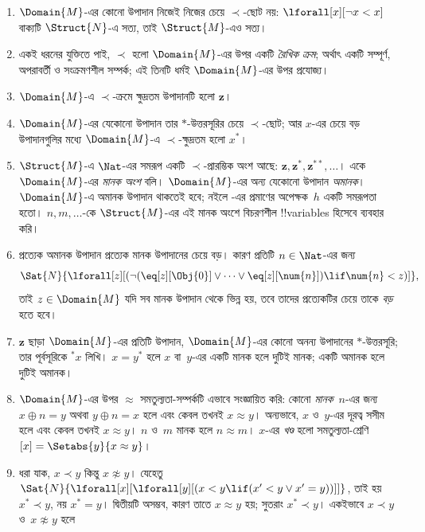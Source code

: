 \documentclass[../../../include/open-logic-section]{subfiles}
\begin{document}
\begin{enumerate}
\item $\Domain{M}$-এর কোনো উপাদান নিজেই নিজের চেয়ে $\prec$-ছোট নয়:
  $\lforall[x][\lnot x < x]$ বাক্যটি $\Struct{N}$-এ সত্য,
  তাই $\Struct{M}$-এও সত্য।
\item একই ধরনের যুক্তিতে পাই, $\prec$ হলো $\Domain{M}$-এর উপর
  একটি \emph{রৈখিক ক্রম}; অর্থাৎ একটি সম্পূর্ণ, অপরাবর্তী ও
  সংক্রমণশীল সম্পর্ক; এই তিনটি ধর্মই $\Domain{M}$-এর উপর প্রযোজ্য।
\item $\Domain{M}$-এ $\prec$-ক্রমে ক্ষুদ্রতম উপাদানটি হলো
  $\mathbf{z}$।
\item $\Domain{M}$-এর যেকোনো উপাদান তার $*$-উত্তরসূরির চেয়ে
  $\prec$-ছোট; আর $x$-এর চেয়ে বড় উপাদানগুলির মধ্যে
  $\Domain{M}$-এ $\prec$-ক্ষুদ্রতম হলো $x^*$।
\item $\Struct{M}$-এ $\Nat$-এর সমরূপ একটি $\prec$-প্রারম্ভিক
  অংশ আছে: $\mathbf{z}, \mathbf{z}^*, \mathbf{z}^{**}, \dots$।
  একে $\Domain{M}$-এর \emph{মানক অংশ} বলি। $\Domain{M}$-এর
  অন্য যেকোনো উপাদান \emph{অমানক}। $\Domain{M}$-এ
  অমানক উপাদান থাকতেই হবে;
  নইলে -এর প্রমাণের অপেক্ষক~$h$ একটি
  সমরূপতা হতো। $n, m, \dots$-কে $\Struct{M}$-এর এই মানক
  অংশে বিচরণশীল !!{variable}s হিসেবে ব্যবহার করি।
\item প্রত্যেক অমানক উপাদান প্রত্যেক মানক উপাদানের চেয়ে বড়।
  কারণ প্রতিটি $n \in \Nat$-এর জন্য
  \[
  \Sat{N}{\lforall[z][(\lnot(\eq[z][\Obj{0}] \lor
  \dots \lor \eq[z][\num{n}]) \lif \num{n} < z)]},
  \]
  তাই $z \in \Domain{M}$ যদি সব মানক উপাদান থেকে ভিন্ন হয়,
  তবে তাদের প্রত্যেকটির চেয়ে তাকে \emph{বড়} হতে হবে।
\item $\mathbf{z}$ ছাড়া $\Domain{M}$-এর প্রতিটি উপাদান,
  $\Domain{M}$-এর কোনো অনন্য উপাদানের $*$-উত্তরসূরি;
  তার পূর্বসূরিকে $^*x$ লিখি। $x=y^*$ হলে $x$ বা~$y$-এর
  একটি মানক হলে দুটিই মানক; একটি অমানক হলে দুটিই অমানক।
\item $\Domain{M}$-এর উপর $\approx$ সমতুল্যতা-সম্পর্কটি এভাবে
  সংজ্ঞায়িত করি: কোনো \emph{মানক}~$n$-এর জন্য $x \oplus n = y$
  অথবা $y \oplus n =x$ হলে এবং কেবল তখনই $x \approx y$।
  অন্যভাবে, $x$ ও~$y$-এর দূরত্ব সসীম হলে এবং কেবল তখনই
  $x \approx y$। $n$ ও~$m$ মানক হলে $n \approx m$। $x$-এর
  \emph{খণ্ড} হলো সমতুল্যতা-শ্রেণি $[x] = \Setabs{y}{x
  \approx y}$।
\item ধরা যাক, $x \prec y$ কিন্তু $x \not\approx y$। যেহেতু
  $\Sat{N}{\lforall[x][\lforall[y][(x < y \lif (x' < y \lor x' =
      y))]]}$, তাই হয় $x^* \prec y$, নয় $x^*=y$। দ্বিতীয়টি
  অসম্ভব, কারণ তাতে $x\approx y$ হয়; সুতরাং $x^* \prec y$।
  একইভাবে $x \prec y$ ও~$x \not\approx y$ হলে

\end{enumerate}
\end{document}
